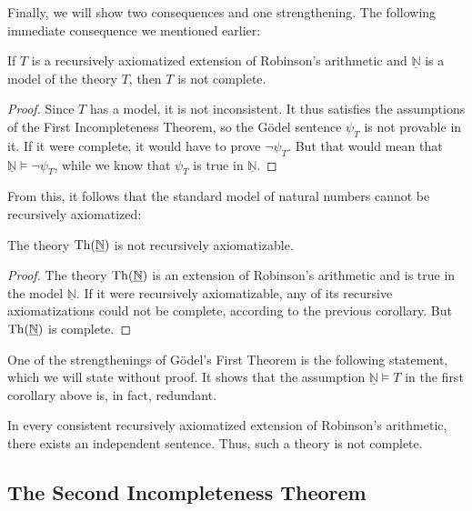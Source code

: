     Finally, we will show two consequences and one strengthening. The following immediate consequence we mentioned earlier:
    
    \begin{corollary}
    If $T$ is a recursively axiomatized extension of Robinson's arithmetic and $\underline{\mathbb N}$ is a model of the theory $T$, then $T$ is not complete.
    \end{corollary}
    \begin{proof}
    Since $T$ has a model, it is not inconsistent. It thus satisfies the assumptions of the First Incompleteness Theorem, so the Gödel sentence $\psi_T$ is not provable in it. If it were complete, it would have to prove $\neg\psi_T$. But that would mean that $\underline{\mathbb N}\models\neg\psi_T$, while we know that $\psi_T$ is true in $\underline{\mathbb N}$.  
    \end{proof}
    
    From this, it follows that the standard model of natural numbers cannot be recursively axiomatized:
    \begin{corollary}
    The theory $\operatorname{Th}(\underline{\mathbb N})$ is not recursively axiomatizable.    
    \end{corollary}
    \begin{proof}
    The theory $\operatorname{Th}(\underline{\mathbb N})$ is an extension of Robinson's arithmetic and is true in the model $\underline{\mathbb N}$. If it were recursively axiomatizable, any of its recursive axiomatizations could not be complete, according to the previous corollary. But $\operatorname{Th}(\underline{\mathbb N})$ is complete.
    \end{proof}
    
    One of the strengthenings of Gödel's First Theorem is the following statement, which we will state without proof. It shows that the assumption $\underline{\mathbb N}\models T$ in the first corollary above is, in fact, redundant.
    
    \begin{theorem}
    In every consistent recursively axiomatized extension of Robinson's arithmetic, there exists an independent sentence. Thus, such a theory is not complete.    
    \end{theorem}
    
    \subsection{The Second Incompleteness Theorem}
    
